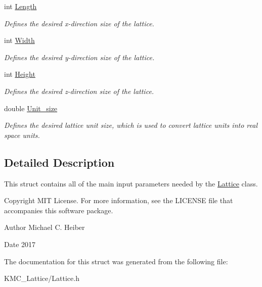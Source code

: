 \begin{DoxyCompactItemize}
\mbox{\label{struct_parameters___lattice_a99c7d553111bb660032bb7ca6f592da6}} 
int \hyperlink{struct_parameters___lattice_a99c7d553111bb660032bb7ca6f592da6}{Length}
\begin{DoxyCompactList}\small\item\em Defines the desired x-\/direction size of the lattice. \end{DoxyCompactList}\item 
\mbox{\label{struct_parameters___lattice_a40f8633b47d204f471d041a0d8216e5b}} 
int \hyperlink{struct_parameters___lattice_a40f8633b47d204f471d041a0d8216e5b}{Width}
\begin{DoxyCompactList}\small\item\em Defines the desired y-\/direction size of the lattice. \end{DoxyCompactList}\item 
\mbox{\label{struct_parameters___lattice_a1b59e1a307ad945fb86f44b68354f605}} 
int \hyperlink{struct_parameters___lattice_a1b59e1a307ad945fb86f44b68354f605}{Height}
\begin{DoxyCompactList}\small\item\em Defines the desired z-\/direction size of the lattice. \end{DoxyCompactList}\item 
\mbox{\label{struct_parameters___lattice_a5f9628b968ba4206a7650c774827b1f0}} 
double \hyperlink{struct_parameters___lattice_a5f9628b968ba4206a7650c774827b1f0}{Unit\+\_\+size}
\begin{DoxyCompactList}\small\item\em Defines the desired lattice unit size, which is used to convert lattice units into real space units. \end{DoxyCompactList}\end{DoxyCompactItemize}


\subsection{Detailed Description}
This struct contains all of the main input parameters needed by the \hyperlink{class_lattice}{Lattice} class. 

\begin{DoxyCopyright}{Copyright}
M\+IT License. For more information, see the L\+I\+C\+E\+N\+SE file that accompanies this software package. 
\end{DoxyCopyright}
\begin{DoxyAuthor}{Author}
Michael C. Heiber 
\end{DoxyAuthor}
\begin{DoxyDate}{Date}
2017 
\end{DoxyDate}


The documentation for this struct was generated from the following file\+:\begin{DoxyCompactItemize}
\item 
K\+M\+C\+\_\+\+Lattice/Lattice.\+h\end{DoxyCompactItemize}
